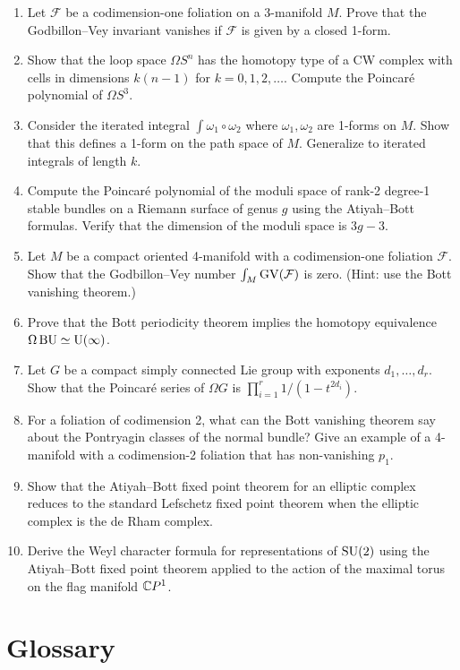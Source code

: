 \begin{enumerate}
    \item [I] Let \(\mathcal{F}\) be a codimension-one foliation on a 3-manifold \(M\). Prove that the Godbillon--Vey invariant vanishes if \(\mathcal{F}\) is given by a closed 1-form.
    \item [I] Show that the loop space \(\Omega S^n\) has the homotopy type of a CW complex with cells in dimensions \(k(n-1)\) for \(k = 0,1,2,\dots\). Compute the Poincar\'e polynomial of \(\Omega S^3\).
    \item [I] Consider the iterated integral \(\int \omega_1 \circ \omega_2\) where \(\omega_1, \omega_2\) are 1-forms on \(M\). Show that this defines a 1-form on the path space of \(M\). Generalize to iterated integrals of length \(k\).
    \item [A] Compute the Poincar\'e polynomial of the moduli space of rank-2 degree-1 stable bundles on a Riemann surface of genus \(g\) using the Atiyah--Bott formulas. Verify that the dimension of the moduli space is \(3g - 3\).
    \item [I] Let \(M\) be a compact oriented 4-manifold with a codimension-one foliation \(\mathcal{F}\). Show that the Godbillon--Vey number \(\int_M \operatorname{GV}(\mathcal{F})\) is zero. (Hint: use the Bott vanishing theorem.)
    \item [I] Prove that the Bott periodicity theorem implies the homotopy equivalence \(\Omega \operatorname{BU} \simeq \operatorname{U}(\infty)\).
    \item [A] Let \(G\) be a compact simply connected Lie group with exponents \(d_1, \dots, d_r\). Show that the Poincar\'e series of \(\Omega G\) is \(\prod_{i=1}^r 1/(1 - t^{2d_i})\).
    \item [A] For a foliation of codimension 2, what can the Bott vanishing theorem say about the Pontryagin classes of the normal bundle? Give an example of a 4-manifold with a codimension-2 foliation that has non-vanishing \(p_1\).
    \item [I] Show that the Atiyah--Bott fixed point theorem for an elliptic complex reduces to the standard Lefschetz fixed point theorem when the elliptic complex is the de Rham complex.
    \item [A] Derive the Weyl character formula for representations of \(\operatorname{SU}(2)\) using the Atiyah--Bott fixed point theorem applied to the action of the maximal torus on the flag manifold \(\mathbb{C} P^1\).
\end{enumerate}

\section*{Glossary}

